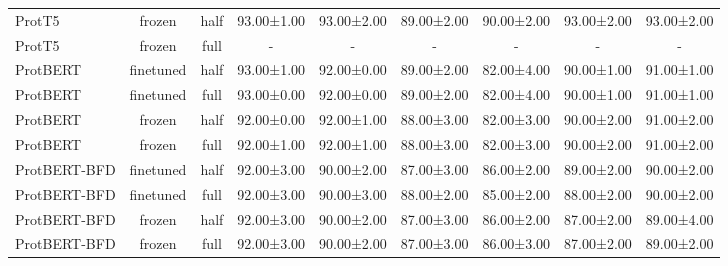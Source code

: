 \begin{tabular}{lcccccccc}
      ProtT5 &         frozen &      half & 93.00±1.00 & 93.00±2.00 & 89.00±2.00 & 90.00±2.00 & 93.00±2.00 & 93.00±2.00 \\
      ProtT5 &         frozen &      full &          - &          - &          - &          - &          - &          - \\
    ProtBERT &      finetuned &      half & 93.00±1.00 & 92.00±0.00 & 89.00±2.00 & 82.00±4.00 & 90.00±1.00 & 91.00±1.00 \\
    ProtBERT &      finetuned &      full & 93.00±0.00 & 92.00±0.00 & 89.00±2.00 & 82.00±4.00 & 90.00±1.00 & 91.00±1.00 \\
    ProtBERT &         frozen &      half & 92.00±0.00 & 92.00±1.00 & 88.00±3.00 & 82.00±3.00 & 90.00±2.00 & 91.00±2.00 \\
    ProtBERT &         frozen &      full & 92.00±1.00 & 92.00±1.00 & 88.00±3.00 & 82.00±3.00 & 90.00±2.00 & 91.00±2.00 \\
ProtBERT-BFD &      finetuned &      half & 92.00±3.00 & 90.00±2.00 & 87.00±3.00 & 86.00±2.00 & 89.00±2.00 & 90.00±2.00 \\
ProtBERT-BFD &      finetuned &      full & 92.00±3.00 & 90.00±3.00 & 88.00±2.00 & 85.00±2.00 & 88.00±2.00 & 90.00±2.00 \\
ProtBERT-BFD &         frozen &      half & 92.00±3.00 & 90.00±2.00 & 87.00±3.00 & 86.00±2.00 & 87.00±2.00 & 89.00±4.00 \\
ProtBERT-BFD &         frozen &      full & 92.00±3.00 & 90.00±2.00 & 87.00±3.00 & 86.00±3.00 & 87.00±2.00 & 89.00±2.00 \\
\bottomrule
\end{tabular}

